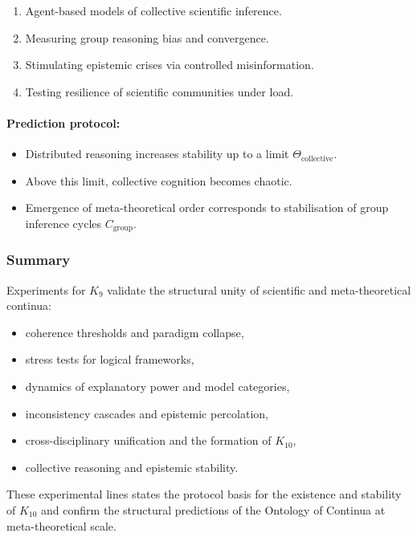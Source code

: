 \begin{enumerate}
    \item Agent-based models of collective scientific inference.
    \item Measuring group reasoning bias and convergence.
    \item Stimulating epistemic crises via controlled misinformation.
    \item Testing resilience of scientific communities under load.
\end{enumerate}

\paragraph{Prediction protocol:}

\begin{itemize}
    \item Distributed reasoning increases stability up to a limit 
          $\Theta_{\mathrm{collective}}$.
    \item Above this limit, collective cognition becomes chaotic.
    \item Emergence of meta-theoretical order corresponds to stabilisation
          of group inference cycles $C_{\mathrm{group}}$.
\end{itemize}



\subsubsection{Summary}

Experiments for $K_9$ validate the structural unity of scientific and
meta-theoretical continua:

\begin{itemize}
    \item coherence thresholds and paradigm collapse,
    \item stress tests for logical frameworks,
    \item dynamics of explanatory power and model categories,
    \item inconsistency cascades and epistemic percolation,
    \item cross-disciplinary unification and the formation of $K_{10}$,
    \item collective reasoning and epistemic stability.
\end{itemize}

These experimental lines states the protocol basis for the 
existence and stability of $K_{10}$ and confirm the structural 
predictions of the Ontology of Continua at meta-theoretical scale.
